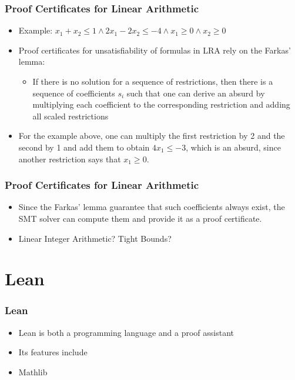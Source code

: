 \documentclass[usepdftitle=false,aspectratio=169,usenames,dvipsnames]{beamer}
\newcommand\vitem{\vfill\item}
\begin{document}
\begin{frame}
  \frametitle{Proof Certificates for Linear Arithmetic}
  \begin{itemize}
    \item Example: $x_{1} + x_{2} \le 1 \wedge 2x_{1} - 2x_{2} \le -4 \wedge x_{1} \ge 0 \wedge x_{2} \ge 0$
    \vitem Proof certificates for unsatisfiability of formulas in LRA rely on the Farkas' lemma:
    \begin{itemize}
      \item If there is no solution for a sequence of restrictions, then there is a sequence of coefficients $s_{i}$ such that one can derive an absurd by multiplying each coefficient to the corresponding restriction and adding all scaled restrictions
    \end{itemize}
    \vitem For the example above, one can multiply the first restriction by 2 and the second by 1 and add them to obtain $4x_{1} \le -3$, which is an absurd, since another restriction says that $x_{1} \ge 0$.
  \end{itemize}
\end{frame}

\begin{frame}
  \frametitle{Proof Certificates for Linear Arithmetic}
  \begin{itemize}
    \item Since the Farkas' lemma guarantee that such coefficients always exist, the SMT solver can compute them and provide it as a proof certificate.
    \vitem Linear Integer Arithmetic? Tight Bounds?
  \end{itemize}
\end{frame}

\section{Lean}

\begin{frame}
  \frametitle{Lean}
  \begin{itemize}
    \item Lean is both a programming language and a proof assistant
    \vitem Its features include
    \vitem Mathlib
  \end{itemize}
\end{frame}
\end{document}
